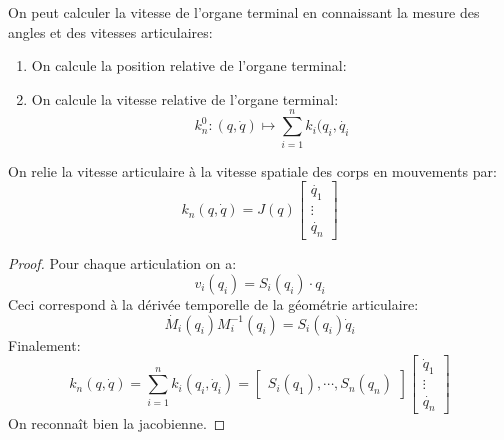 \documentclass[math]{cours}
\begin{document}
\begin{proposition}
	On peut calculer la vitesse de l'organe terminal en connaissant la mesure des angles et des vitesses articulaires:
	\begin{enumerate}
		\item On calcule la position relative de l'organe terminal:
		\item On calcule la vitesse relative de l'organe terminal:
		      \begin{equation*}
			      k_{n}^{0}: (q, \dot{q}) \mapsto \sum_{i = 1}^{n} k_{i}(q_{i}, \dot{q_{i}}
		      \end{equation*}
	\end{enumerate}
	\label{prop:vitesseterminale}
\end{proposition}

\begin{thm}
	On relie la vitesse articulaire à la vitesse spatiale des corps en mouvements par:
	\begin{equation*}
		k_{n}(q, \dot{q}) = J(q)\begin{bmatrix}
			\dot{q_{1}} \\
			\vdots      \\
			\dot{q_{n}}
		\end{bmatrix}
	\end{equation*}
\end{thm}
\begin{proof}
	Pour chaque articulation on a:
	\begin{equation*}
		v_{i}(q_{i}) = S_{i}(q_{i})\cdot{q}_{i}
	\end{equation*}
	Ceci correspond à la dérivée temporelle de la géométrie articulaire:
	\begin{equation*}
		\dot{M_{i}}(q_{i})M_{i}^{-1}(q_{i}) = S_{i}(q_{i})\dot{q}_{i}
	\end{equation*}
	Finalement:
	\begin{equation*}
		k_{n}(q, \dot{q}) = \sum_{i = 1}^{n}k_{i}(q_{i}, \dot{q}_{i}) =
		\begin{bmatrix}
			S_{i}(q_{1}), \cdots, S_{n}(q_{n})
		\end{bmatrix}
		\begin{bmatrix}
			\dot{q}_{1} \\
			\vdots      \\
			\dot{q_{n}}
		\end{bmatrix}
	\end{equation*}
	On reconnaît bien la jacobienne.
\end{proof}
\end{document}
